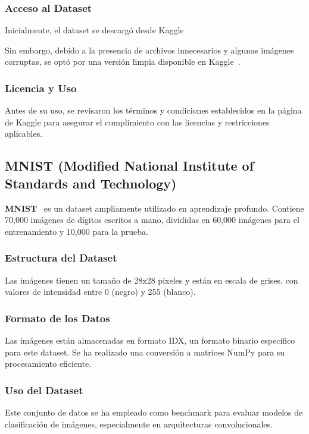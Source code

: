 \subsubsection{Acceso al Dataset}
Inicialmente, el dataset se descargó desde Kaggle~\cite{noauthor_original_nodate}

Sin embargo, debido a la presencia de archivos innecesarios y algunas imágenes corruptas, se optó por una versión
limpia disponible en Kaggle~\cite{noauthor_cleaned_nodate}.

\subsubsection{Licencia y Uso}
Antes de su uso, se revisaron los términos y condiciones establecidos en la página de Kaggle para asegurar el
cumplimiento con las licencias y restricciones aplicables.

\subsection{MNIST (Modified National Institute of Standards and Technology)}\label{subsec:mnist}
\textbf{MNIST}~\cite{noauthor_mnist_nodate} es un dataset ampliamente utilizado en aprendizaje profundo.
Contiene 70,000 imágenes de dígitos escritos a mano, divididas en 60,000 imágenes para el entrenamiento y 10,000 para
la prueba.

\subsubsection{Estructura del Dataset}
Las imágenes tienen un tamaño de 28x28 píxeles y están en escala de grises, con valores de intensidad entre 0 (negro) y
255 (blanco).

\subsubsection{Formato de los Datos}
Las imágenes están almacenadas en formato IDX, un formato binario específico para este dataset.
Se ha realizado una conversión a matrices NumPy para su procesamiento eficiente.

\subsubsection{Uso del Dataset}
Este conjunto de datos se ha empleado como benchmark para evaluar modelos de clasificación de imágenes, especialmente
en arquitecturas convolucionales.

